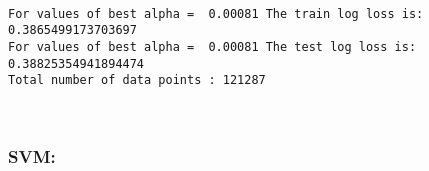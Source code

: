 \documentclass[11pt]{article}
\begin{document}
    \begin{center}
    \end{center}
    { \hspace*{\fill} \\}
    
    \begin{Verbatim}[commandchars=\\\{\}]
For values of best alpha =  0.00081 The train log loss is: 0.3865499173703697
For values of best alpha =  0.00081 The test log loss is: 0.38825354941894474
Total number of data points : 121287

    \end{Verbatim}

    \begin{center}
    \end{center}
    { \hspace*{\fill} \\}
    
    \subsubsection{SVM:}\label{svm}
\end{document}
